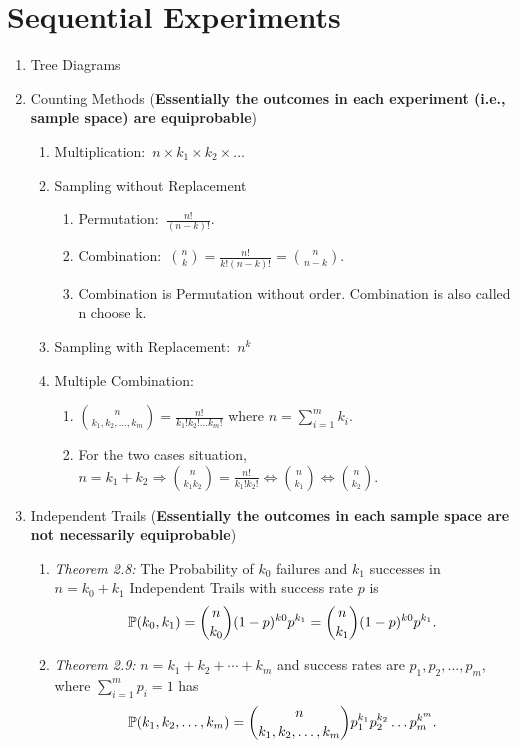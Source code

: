 \chapter{Sequential Experiments}
\begin{enumerate}
    \item Tree Diagrams
    \item Counting Methods (\textbf{Essentially the outcomes in each experiment (i.e., sample space) are equiprobable})
    \begin{enumerate}
        \item Multiplication:~$n\times k_1\times k_2\times \ldots$
        \item Sampling without Replacement
        \begin{enumerate}
            \item Permutation:~$\frac{n!}{(n-k)!}$.
            \item Combination:~$\binom{n}{k}=\frac{n!}{k!(n-k)!}=\binom{n}{n-k}$.
            \item Combination is Permutation without order. Combination is also called n choose k.
        \end{enumerate}
        \item Sampling with Replacement:~$n^k$
        \item Multiple Combination:{
            \begin{enumerate}
                \item $\binom{n}{k_1,k_2,\ldots,k_m}=\frac{n!}{k_1!k_2!\ldots k_m!}$ where $n=\sum_{i=1}^{m}k_i$.
                \item For the two cases situation, $n=k_1+k_2\Rightarrow \binom{n}{k_1k_2}=\frac{n!}{k_1!k_2!}\iff\binom{n}{k_1}\iff\binom{n}{k_2}$.
            \end{enumerate}
            }
    \end{enumerate}
    \item Independent Trails (\textbf{Essentially the outcomes in each sample space are not necessarily equiprobable})
    \begin{enumerate}
        \item \textit{Theorem 2.8:} The Probability of $k_0$ failures and $k_1$ successes in $n=k_0+k_1$ Independent Trails with success rate $p$ is \[\P{k_0, k_1}=\binom{n}{k_0}(1-p)^{k0}p^{k_1}=\binom{n}{k_1}(1-p)^{k0}p^{k_1}.\]
        \item \textit{Theorem 2.9:} $n=k_1+k_2+\cdots+k_m$ and success rates are $p_1, p_2,\ldots,p_m$, where $\sum_{i=1}^{m}p_i=1$ has 
        \[\P{k_1,k_2,\ldots,k_m}=\binom{n}{k_1,k_2,\ldots,k_m}p_1^{k_1}p_2^{k_2}\ldots p_m^{k^m}.\]
    \end{enumerate}
\end{enumerate}